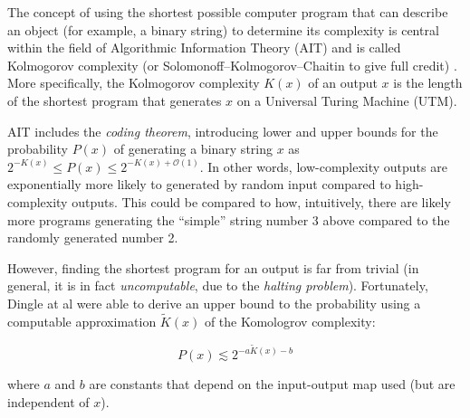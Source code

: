 The concept of using the shortest possible computer program that can describe an object (for example, a binary string) to determine its complexity is central within the field of Algorithmic Information Theory (AIT) and is called Kolmogorov complexity (or Solomonoff–Kolmogorov–Chaitin to give full credit) \cite{LiMing2019AitK}. More specifically, the Kolmogorov complexity \(K(x)\) of an output \(x\) is the length of the shortest program that generates \(x\) on a Universal Turing Machine (UTM).

AIT includes the \emph{coding theorem}, introducing lower and upper bounds for the probability \(P(x)\) of generating a binary string \(x\) as \(2^{-K(x)} \le P(x) \le 2^{-K(x) + \mathcal{O} (1)}\). In other words, low-complexity outputs are exponentially more likely to generated by random input compared to high-complexity outputs. This could be compared to how, intuitively, there are likely more programs generating the ``simple'' string number 3 above compared to the randomly generated number 2.

However, finding the shortest program for an output is far from trivial (in general, it is in fact \emph{uncomputable}, due to the \emph{halting problem}). Fortunately, Dingle at al \cite{dingle2018input} were able to derive an upper bound to the probability using a computable approximation \(\widetilde{K}(x)\) of the Komologrov complexity:

\[
  P(x) \lesssim 2^{-a\widetilde{K}(x) -b}
\]

where \(a\) and \(b\) are constants that depend on the input-output map used (but are independent of \(x\)).


